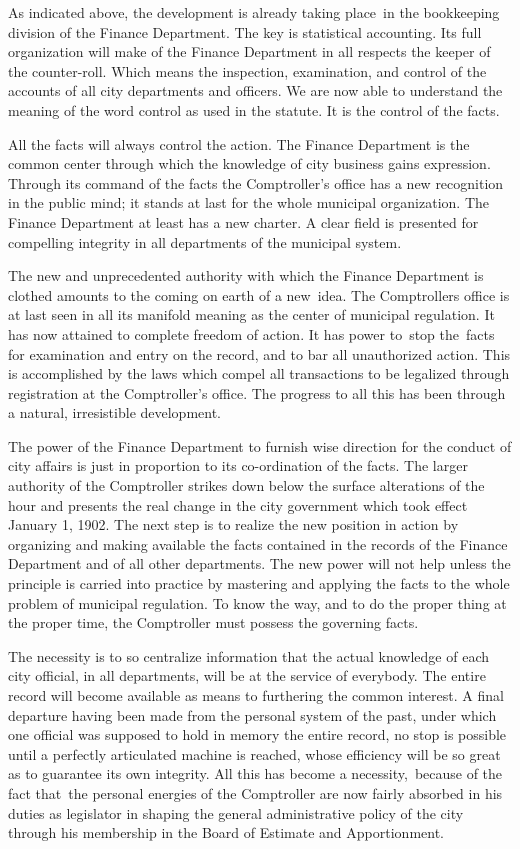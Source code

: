 \documentclass[twoside,symmetric,nobib,justified]{tufte-book}
\begin{document}
As indicated above, the development is already taking place~in the
bookkeeping division of the Finance Department. The key is statistical
accounting. Its full organization will make of the Finance Department in
all respects the keeper of the counter-roll. Which means the inspection,
examination, and control of the accounts of all city departments and
officers. We are now able to understand the meaning of the word control
as used in the statute. It is the control of the facts.~

All the facts will always control the action. The Finance Department is
the common center through which the knowledge of city business gains
expression. Through its command of the facts the Comptroller's office
has a new recognition in the public mind; it stands at last for the
whole municipal organization. The Finance Department at least has a new
charter. A clear field is presented for compelling integrity in all
departments of the municipal system.~

The new and unprecedented authority with which the Finance Department is
clothed amounts to the coming on earth of a new~idea. The
Comptroller\textquotesingle s office is at last seen in all its manifold
meaning as the center of municipal regulation. It has now attained to
complete freedom of action. It has power to~stop the~facts for
examination and entry on the record, and to bar all unauthorized action.
This is accomplished by the laws which compel all transactions to be
legalized through registration at the Comptroller's office. The progress
to all this has been through a natural, irresistible development.~

The power of the Finance Department to furnish wise direction for the
conduct of city affairs is just in proportion to its co-ordination of
the facts. The larger authority of the Comptroller strikes down below
the surface alterations of the hour and presents the real change in the
city government which took effect January 1, 1902. The next step is to
realize the new position in action by organizing and making available
the facts contained in the records of the Finance Department and of all
other departments. The new power will not help unless the principle is
carried into practice by mastering and applying the facts to the whole
problem of municipal regulation. To know the way, and to do the proper
thing at the proper time, the Comptroller must possess the governing
facts.~

The necessity is to so centralize information that the actual knowledge
of each city official, in all departments, will be at the service of
everybody. The entire record will become available as means to
furthering the common interest. A final departure having been made from
the personal system of the past, under which one official was supposed
to hold in memory the entire record, no stop is possible until a
perfectly articulated machine is reached, whose efficiency will be so
great as to guarantee its own integrity. All this has become a
necessity,~because of the fact that~the personal energies of the
Comptroller are now fairly absorbed in his duties as legislator in
shaping the general administrative policy of the city through his
membership in the Board of Estimate and Apportionment.~
\end{document}
